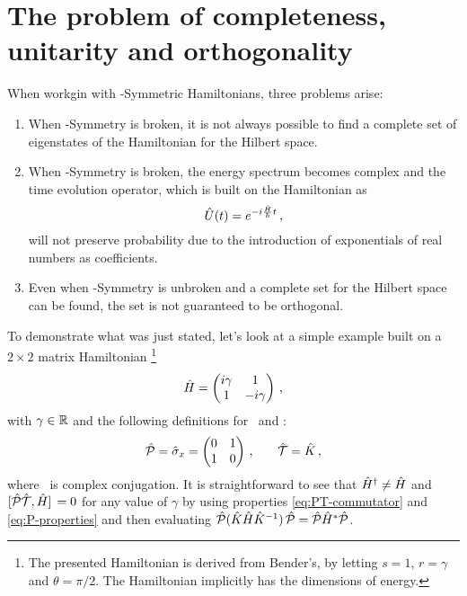     \section{The problem of completeness, unitarity and orthogonality}
        When workgin with \PT-Symmetric Hamiltonians, three problems arise:
        \begin{enumerate}[label = \mybullet]
            \item When \PT-Symmetry is broken, it is not always possible to find a complete set of eigenstates of the Hamiltonian for the Hilbert space.
            \item When \PT-Symmetry is broken, the energy spectrum becomes complex and the time evolution operator, which is built on the Hamiltonian as 
            \begin{equation}
                \label{eq:time-evolution}
                \hU\pqty{t} = \myexp{-i\frac{\hH}{\hbar}t}
                \mycomma
            \end{equation}
            will not preserve probability due to the introduction of exponentials of real numbers as coefficients.
            \item Even when \PT-Symmetry is unbroken and a complete set for the Hilbert space can be found, the set is not guaranteed to be orthogonal.
        \end{enumerate}
        To demonstrate what was just stated, let's look at a simple example built on a $2\times2$ matrix Hamiltonian \cite{Bender2005,Bender2007}\footnote{The presented Hamiltonian is derived from Bender's, by letting $s = 1$, $r = \gamma$ and $\theta = \pi/2$. The Hamiltonian implicitly has the dimensions of energy.}
        \begin{equation}
            \label{eq:ex:reduced-2x2-hamiltonian}
            \hH = \pmqty{\dmat[1]{i\gamma, -i\gamma}}
            \mycomma
        \end{equation}
        with $\gamma\in\mathbb{R}$ and the following definitions for \hP\ and \hT :
        \begin{equation}
            \label{eq:ex:reduced-2x2-P-T}
            \hP = \hat{\sigma}_x = \pmqty{\admat[0]{1,1}}
            \mycomma\qquad
            \hT = \hK
            \mycomma
        \end{equation}
        where \hK\ is complex conjugation. It is straightforward to see that $\hat{H}^\dag \neq \hat{H}$ and $\comm*{\hPT}{\hH} = 0$ for any value of $\gamma$ by using properties \eqref{eq:PT-commutator} and \eqref{eq:P-properties} and then evaluating $\hP\pqty*{\hK\hH\hK^{-1}}\hP = \hP\hH^*\hP$.
        
